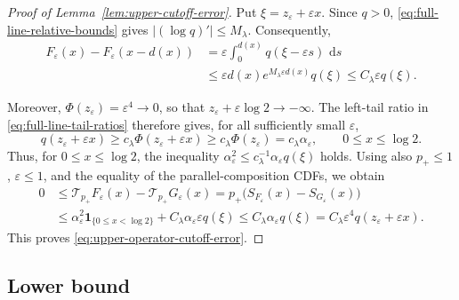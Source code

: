 \documentclass[12pt,preprint]{amsart}
\numberwithin{equation}{section}
\theoremstyle{plain}
\theoremstyle{definition}
\newcommand{\ind}{\mathbf 1}
\newcommand{\dd}{\,\mathrm d}
\begin{document}
\begin{proof}[Proof of Lemma~\ref{lem:upper-cutoff-error}]
Put $\xi=z_\varepsilon+\varepsilon x$.  Since $q>0$,
\eqref{eq:full-line-relative-bounds} gives
$|(\log q)'|\le M_\lambda$.  Consequently,
\[
\begin{aligned}
 F_\varepsilon(x)-F_\varepsilon(x-d(x))
 &=\varepsilon\int_0^{d(x)}q(\xi-\varepsilon s)\,\dd s\\
 &\le\varepsilon d(x)e^{M_\lambda\varepsilon d(x)}q(\xi)
 \le C_\lambda\varepsilon q(\xi).
\end{aligned}
\]

Moreover, $\Phi(z_\varepsilon)=\varepsilon^4\to0$, so that
$z_\varepsilon+\varepsilon\log2\to-\infty$.  The left-tail ratio in
\eqref{eq:full-line-tail-ratios} therefore gives, for all sufficiently
small $\varepsilon$,
\[
 q(z_\varepsilon+\varepsilon x)
 \ge c_\lambda\Phi(z_\varepsilon+\varepsilon x)
 \ge c_\lambda\Phi(z_\varepsilon)
 =c_\lambda\alpha_\varepsilon,
 \qquad 0\le x\le\log2.
\]
Thus, for $0\le x\le\log2$, the inequality
$\alpha_\varepsilon^2\le
c_\lambda^{-1}\alpha_\varepsilon q(\xi)$ holds.  Using also
$p_+\le1$, $\varepsilon\le1$, and the equality of the parallel-composition
CDFs, we obtain
\[
\begin{aligned}
 0
 &\le \mathcal T_{p_+}F_\varepsilon(x)
       -\mathcal T_{p_+}G_\varepsilon(x)
 =p_+\bigl(S_{F_\varepsilon}(x)-S_{G_\varepsilon}(x)\bigr)\\
 &\le \alpha_\varepsilon^2\ind_{\{0\le x<\log2\}}
       +C_\lambda\alpha_\varepsilon\varepsilon q(\xi)
 \le C_\lambda\alpha_\varepsilon q(\xi)
 =C_\lambda\varepsilon^4q(z_\varepsilon+\varepsilon x).
\end{aligned}
\]
This proves \eqref{eq:upper-operator-cutoff-error}.
\end{proof}
\subsection{Lower bound}
\end{document}
